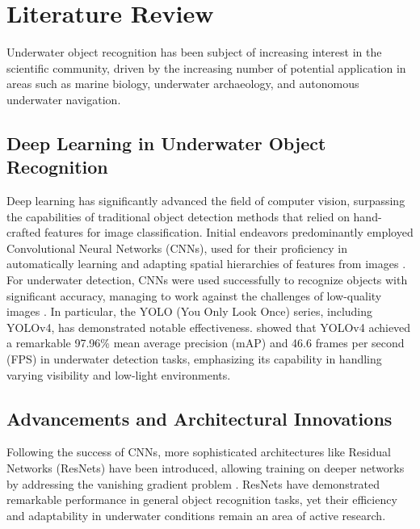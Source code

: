 
\section{Literature Review}
Underwater object recognition has been subject of increasing interest in the
scientific community, driven by the increasing number of
potential application in areas such as marine biology, underwater archaeology,
and autonomous underwater navigation.

\subsection{Deep Learning in Underwater Object Recognition}
Deep learning has significantly advanced the field of computer vision,
surpassing the capabilities of traditional object detection methods that
relied on hand-crafted features for image classification.
Initial endeavors predominantly employed Convolutional Neural Networks
(CNNs), used for their proficiency in automatically learning
and adapting spatial hierarchies of features from
images \parencite{zhiqiangReviewObjectDetection2017}.
For underwater detection, CNNs were used successfully to recognize objects with
significant accuracy, managing to work against the challenges of low-quality
images \parencite{hanUnderwaterImageProcessing2020}.
In particular, the YOLO (You Only Look Once) series, including YOLOv4,
has demonstrated notable effectiveness.
\Textcite{rosliUnderwaterAnimalDetection2021} showed that YOLOv4 achieved a remarkable 97.96\%
mean average precision (mAP) and 46.6 frames per second (FPS) in underwater detection tasks,
emphasizing its capability in handling varying visibility and low-light environments.

\subsection{Advancements and Architectural Innovations}
Following the success of CNNs, more sophisticated architectures
like Residual Networks (ResNets) have been introduced, allowing training on
deeper networks by addressing the vanishing gradient problem 
\parencite{heDeepResidualLearning2016}.
ResNets have demonstrated remarkable performance in general object recognition
tasks, yet their efficiency and adaptability in underwater conditions remain
an area of active research.

